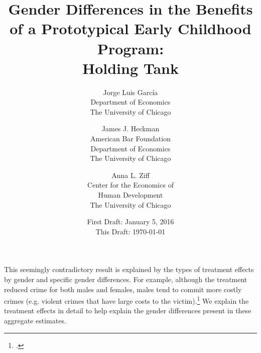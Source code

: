 


\usepackage[stable]{footmisc}

\newcommand*\leftright[2]{%
  \leavevmode
  \rlap{#1}%
  \hspace{0.5\linewidth}%
  #2}

\newcommand{\orth}{\ensuremath{\perp\!\!\!\perp}}%
\newcommand{\indep}{\orth}%
\newcommand{\notorth}{\ensuremath{\perp\!\!\!\!\!\!\diagup\!\!\!\!\!\!\perp}}%
\newcommand{\notindep}{\notorth}





\begin{titlepage}

\title{\Large \textbf{Gender Differences in the Benefits of a Prototypical Early Childhood Program: \\ Holding Tank}}

\author{
Jorge Luis Garc\'{i}a\\
Department of Economics\\
The University of Chicago \and
James J. Heckman \\
American Bar Foundation \\
Department of Economics\\
The University of Chicago \and
Anna L. Ziff \\
Center for the Economics of \\
Human Development \\
The University of Chicago}
\date{First Draft: January 5, 2016\\ This Draft: \today}

\maketitle
\restoregeometry
\end{titlepage}

\clearpage

\restoregeometry
\doublespacing

\setcounter{page}{0}



This seemingly contradictory result is explained by the types of treatment effects by gender and specific gender differences. For example, although the treatment reduced crime for both males and females, males tend to commit more costly crimes (e.g. violent crimes that have large costs to the victim).\footnote{\citet{Cohen-Bowles_2010_Estimating-Cost-Crime,Gregg_etal_2015_SocialRealities_BOOK}.} We explain the treatment effects in detail to help explain the gender differences present in these aggregate estimates.


\clearpage
\singlespacing




